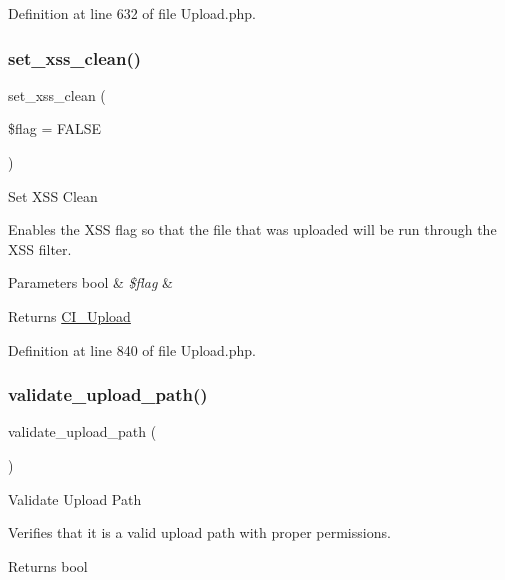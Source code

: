 Definition at line 632 of file Upload.\+php.

\mbox{\label{class_c_i___upload_a5556024223414507d84d221862919212}} 
\subsubsection{\texorpdfstring{set\_xss\_clean()}{set\_xss\_clean()}}
{\footnotesize\ttfamily set\+\_\+xss\+\_\+clean (\begin{DoxyParamCaption}\item[{}]{\$flag = {\ttfamily FALSE} }\end{DoxyParamCaption})}

Set X\+SS Clean

Enables the X\+SS flag so that the file that was uploaded will be run through the X\+SS filter.


\begin{DoxyParams}[1]{Parameters}
bool & {\em \$flag} & \\
\hline
\end{DoxyParams}
\begin{DoxyReturn}{Returns}
\mbox{\hyperlink{class_c_i___upload}{C\+I\+\_\+\+Upload}} 
\end{DoxyReturn}


Definition at line 840 of file Upload.\+php.

\mbox{\label{class_c_i___upload_a067f092935018f0d1fbfa955ddecfee3}} 
\subsubsection{\texorpdfstring{validate\_upload\_path()}{validate\_upload\_path()}}
{\footnotesize\ttfamily validate\+\_\+upload\+\_\+path (\begin{DoxyParamCaption}{ }\end{DoxyParamCaption})}

Validate Upload Path

Verifies that it is a valid upload path with proper permissions.

\begin{DoxyReturn}{Returns}
bool 
\end{DoxyReturn}


